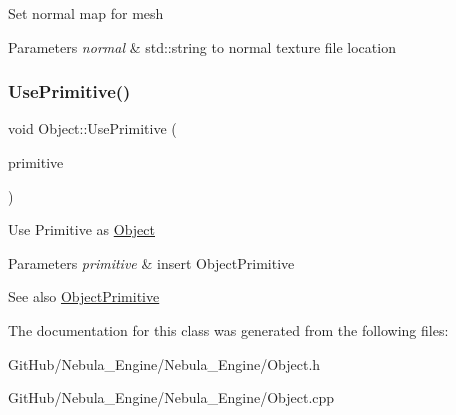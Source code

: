 Set normal map for mesh 
\begin{DoxyParams}{Parameters}
{\em normal} & std\+::string to normal texture file location \\
\hline
\end{DoxyParams}
\mbox{\label{class_object_a7410f426afc88277ad120c83dee28d05}} 
\subsubsection{\texorpdfstring{UsePrimitive()}{UsePrimitive()}}
{\footnotesize\ttfamily void Object\+::\+Use\+Primitive (\begin{DoxyParamCaption}\item[{\mbox{\hyperlink{class_object_a0b1996af0cb36adfb3770ca9d3166253}{Object\+Primitive}}}]{primitive }\end{DoxyParamCaption})}

Use Primitive as \mbox{\hyperlink{class_object}{Object}} 
\begin{DoxyParams}{Parameters}
{\em primitive} & insert Object\+Primitive \\
\hline
\end{DoxyParams}
\begin{DoxySeeAlso}{See also}
\mbox{\hyperlink{class_object_a0b1996af0cb36adfb3770ca9d3166253}{Object\+Primitive}} 
\end{DoxySeeAlso}


The documentation for this class was generated from the following files\+:\begin{DoxyCompactItemize}
\item 
Git\+Hub/\+Nebula\+\_\+\+Engine/\+Nebula\+\_\+\+Engine/Object.\+h\item 
Git\+Hub/\+Nebula\+\_\+\+Engine/\+Nebula\+\_\+\+Engine/Object.\+cpp\end{DoxyCompactItemize}
